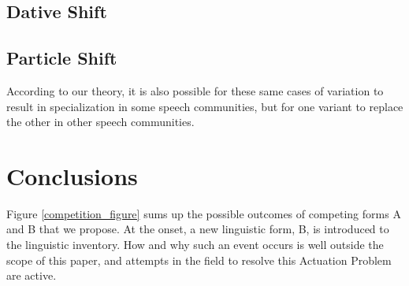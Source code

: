 \subsection{Dative Shift}

\subsection{Particle Shift}


According to our theory, it is also possible for these same cases of variation to result in specialization in some speech communities, but for one variant to replace the other in other speech communities.

\section{Conclusions}






Figure \ref{competition_figure} sums up the possible outcomes of competing forms A and B that we propose. 
At the onset, a new linguistic form, B, is introduced to the linguistic inventory.
How and why such an event occurs is well outside the scope of this paper, and attempts in the field to resolve this Actuation Problem are active.






